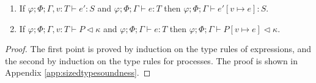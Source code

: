 \begin{lemma}[Substitution]\label{lemma:substibg}\text{ }
\begin{enumerate}
    \item If $\varphi;\Phi;\Gamma,v:T\vdash e' : S$ and $\varphi;\Phi;\Gamma\vdash e : T$ then $\varphi;\Phi;\Gamma\vdash e'[v\mapsto e] : S$.
    \item If $\varphi;\Phi;\Gamma,v:T\vdash P \triangleleft \kappa$ and $\varphi;\Phi;\Gamma\vdash e : T$ then $\varphi;\Phi;\Gamma\vdash P[v\mapsto e] \triangleleft \kappa$.
\end{enumerate}
\begin{proof} The first point is proved by induction on the type rules of expressions, and the second by induction on the type rules for processes. The proof is shown in Appendix \ref{app:sizedtypesoundness}. %

\end{proof}
\end{lemma}

